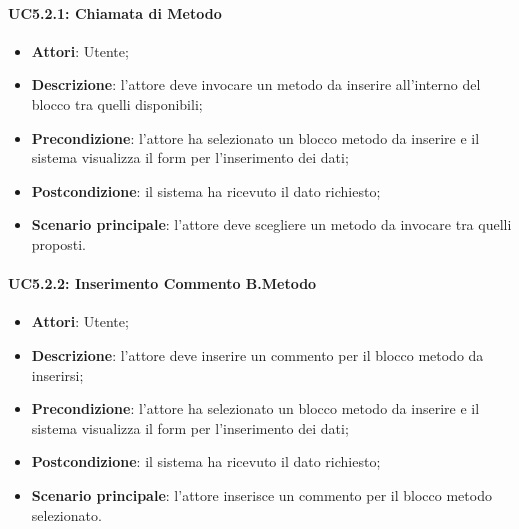 \paragraph{UC5.2.1: Chiamata di Metodo}
\label{UC5.2.1}
\begin{itemize}
\item \textbf{Attori}: Utente;
\item \textbf{Descrizione}: l'attore deve invocare un metodo da inserire all'interno del blocco tra quelli disponibili;	
\item \textbf{Precondizione}:  l'attore ha selezionato un blocco metodo da inserire e il sistema visualizza il form per l'inserimento dei dati;	
\item \textbf{Postcondizione}: il sistema ha ricevuto il dato richiesto;	
\item \textbf{Scenario principale}:
l'attore deve scegliere un metodo da invocare tra quelli proposti.	
\end{itemize}

\paragraph{UC5.2.2: Inserimento Commento B.Metodo}
\label{UC5.2.2}
\begin{itemize}
\item \textbf{Attori}: Utente;
\item \textbf{Descrizione}: l'attore deve inserire un commento per il blocco metodo da inserirsi;	
\item \textbf{Precondizione}: l'attore ha selezionato un blocco metodo da inserire e il sistema visualizza il form per l'inserimento dei dati;	
\item \textbf{Postcondizione}: il sistema ha ricevuto il dato richiesto;	
\item \textbf{Scenario principale}:
l'attore inserisce un commento per il blocco metodo selezionato.
\end{itemize}

